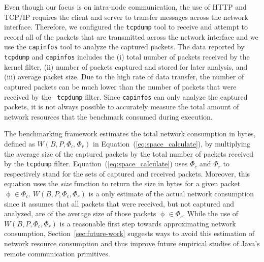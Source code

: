 \documentclass{sig-alternate}
\begin{document}




Even though our focus is on intra-node communication, the use of HTTP
and TCP/IP requires the client and server to transfer messages across
the network interface.  Therefore, we configured the \texttt{tcpdump}
tool to receive and attempt to record all of the packets that are
transmitted across the network interface and we use the {\tt capinfos}
tool to analyze the captured packets.  The data reported by {\tt
  tcpdump} and {\tt capinfos} includes the (i) total number of packets
received by the kernel filter, (ii) number of packets captured and
stored for later analysis, and (iii) average packet size.  Due to the
high rate of data transfer, the number of captured packets can be much
lower than the number of packets that were received by the {\tt
  tcpdump} filter.  Since \texttt{capinfos} can only analyze the
captured packets, it is not always possible to accurately measure the
total amount of network resources that the benchmark consumed during
execution.  

\begin{sloppypar}
The benchmarking framework estimates the total network consumption in
bytes, defined as $W(B,P, \Phi_c, \Phi_r)$ in
Equation~(\ref{eq:space_calculate}), by multiplying the average size
of the captured packets by the total number of packets received by the
{\tt tcpdump} filter.  Equation~(\ref{eq:space_calculate}) uses
$\Phi_c$ and $\Phi_r$ to respectively stand for the sets of captured
and received packets.  Moreover, this equation uses the {\em size}
function to return the size in bytes for a given packet $\upphi \in
\Phi_c$.  $W(B,P, \Phi_c, \Phi_r)$ is a only estimate of the actual
network consumption since it assumes that all packets that were
received, but not captured and analyzed, are of the average size of
those packets $\upphi \in \Phi_c$.  While the use of $W(B,P, \Phi_c,
\Phi_r)$ is a reasonable first step towards approximating network
consumption, Section~\ref{sec:future-work} suggests ways to avoid this
estimation of network resource consumption and thus improve future
empirical studies of Java's remote communication primitives.
\end{sloppypar}
\end{document}
